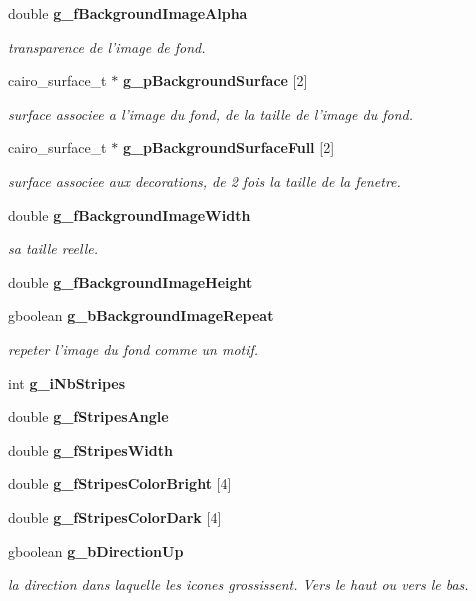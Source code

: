 \begin{CompactItemize}
double {\bf g\_\-f\-Background\-Image\-Alpha}
\begin{CompactList}\small\item\em transparence de l'image de fond. \item\end{CompactList}\item 
cairo\_\-surface\_\-t $\ast$ {\bf g\_\-p\-Background\-Surface} [2]
\begin{CompactList}\small\item\em surface associee a l'image du fond, de la taille de l'image du fond. \item\end{CompactList}\item 
cairo\_\-surface\_\-t $\ast$ {\bf g\_\-p\-Background\-Surface\-Full} [2]
\begin{CompactList}\small\item\em surface associee aux decorations, de 2 fois la taille de la fenetre. \item\end{CompactList}\item 
double {\bf g\_\-f\-Background\-Image\-Width}
\begin{CompactList}\small\item\em sa taille reelle. \item\end{CompactList}\item 
double {\bf g\_\-f\-Background\-Image\-Height}
\item 
gboolean {\bf g\_\-b\-Background\-Image\-Repeat}
\begin{CompactList}\small\item\em repeter l'image du fond comme un motif. \item\end{CompactList}\item 
int {\bf g\_\-i\-Nb\-Stripes}
\item 
double {\bf g\_\-f\-Stripes\-Angle}
\item 
double {\bf g\_\-f\-Stripes\-Width}
\item 
double {\bf g\_\-f\-Stripes\-Color\-Bright} [4]
\item 
double {\bf g\_\-f\-Stripes\-Color\-Dark} [4]
\item 
gboolean {\bf g\_\-b\-Direction\-Up}
\begin{CompactList}\small\item\em la direction dans laquelle les icones grossissent. Vers le haut ou vers le bas. \item\end{CompactList}\item 

\end{CompactItemize}
